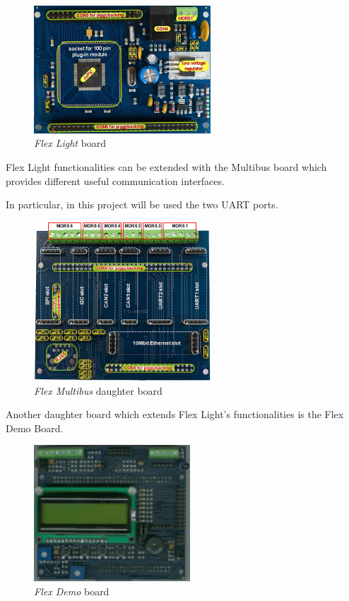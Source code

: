 \documentclass[twoside]{article}
\begin{document}
\begin{multicols}{2}
\begin{figure}[H]
  \centering
  \includegraphics[width=2.6in]{img/flex_light_presentation}
  \caption{\textit{Flex Light} board}
\end{figure}

Flex Light functionalities can be extended with the Multibus board which provides different useful communication interfaces.

In particular, in this project will be used the two UART ports.

\begin{figure}[H]
  \centering
  \includegraphics[width=2.6in]{img/flex101_presentation}
  \caption{\textit{Flex Multibus} daughter board}
\end{figure}

Another daughter board which extends Flex Light's functionalities is the Flex Demo Board.

\begin{figure}[H]
  \centering
  \includegraphics[width=2.3in]{img/flex_demo_board_presentation}
  \caption{\textit{Flex Demo} board}
\end{figure}


\end{multicols}
\end{document}
